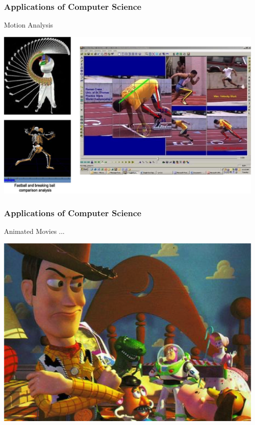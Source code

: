 \documentclass{beamer}
\begin{document}
\begin{frame}
  \frametitle{Applications of Computer Science}
  Motion Analysis
  \begin{center}
  \includegraphics[scale=0.35]{images/sports}
  \end{center}
\end{frame}
\begin{frame}
  \frametitle{Applications of Computer Science}
  Animated Movies ... 
  \begin{center}
  \includegraphics[scale=0.3]{images/ani1}
  \end{center}
\end{frame}
\end{document}
